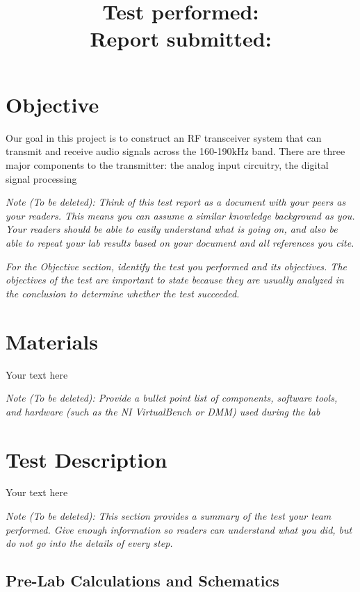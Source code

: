 \documentclass[10pt]{article}
\title{
    \textbf{\courseTitle} \\
    \textbf{\documentTitle} \\
    \bigskip
    \textbf{\large{Test performed: \testDate}} \\
    \textbf{\large{Report submitted: \reportDate}} \\
    \bigskip
    \bigskip
}
\author{\documentAuthor}
\date{}
\begin{document}
\maketitle

\newpage

\section{Objective}

Our goal in this project is to construct an RF transceiver system that can transmit and receive audio signals across the 160-190kHz band. There are three major components to the transmitter: the analog input circuitry, the digital signal processing 

\medskip

\textit{Note (To be deleted): Think of this test report as a document with your peers as your readers. This means you can assume a similar knowledge background as you. Your readers should be able to easily understand what is going on, and also be able to repeat your lab results based on your document and all references you cite.}

\textit{For the Objective section, identify the test you performed and its objectives. The objectives of the test are important to state because they are usually analyzed in the conclusion to determine whether the test succeeded.}

\section{Materials}

Your text here

\medskip

\textit{Note (To be deleted): Provide a bullet point list of components, software tools, and hardware (such as the NI VirtualBench or DMM) used during the lab}

\section{Test Description}

Your text here

\medskip

\textit{Note (To be deleted): This section provides a summary of the test your team performed. Give enough information so readers can understand what you did, but do not go into the details of every step.}

\subsection{Pre-Lab Calculations and Schematics}
\end{document}
